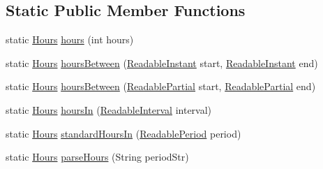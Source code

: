 \subsection*{Static Public Member Functions}
\begin{DoxyCompactItemize}
\item 
static \hyperlink{classorg_1_1joda_1_1time_1_1_hours}{Hours} \hyperlink{classorg_1_1joda_1_1time_1_1_hours_a6f0261af3e1ae208f32b5deb6b2e13d4}{hours} (int hours)
\item 
static \hyperlink{classorg_1_1joda_1_1time_1_1_hours}{Hours} \hyperlink{classorg_1_1joda_1_1time_1_1_hours_ac1421b4a81159603662caef10bdb3c27}{hours\-Between} (\hyperlink{interfaceorg_1_1joda_1_1time_1_1_readable_instant}{Readable\-Instant} start, \hyperlink{interfaceorg_1_1joda_1_1time_1_1_readable_instant}{Readable\-Instant} end)
\item 
static \hyperlink{classorg_1_1joda_1_1time_1_1_hours}{Hours} \hyperlink{classorg_1_1joda_1_1time_1_1_hours_a1ad9e15047fc7100b56f5f1695575aa9}{hours\-Between} (\hyperlink{interfaceorg_1_1joda_1_1time_1_1_readable_partial}{Readable\-Partial} start, \hyperlink{interfaceorg_1_1joda_1_1time_1_1_readable_partial}{Readable\-Partial} end)
\item 
static \hyperlink{classorg_1_1joda_1_1time_1_1_hours}{Hours} \hyperlink{classorg_1_1joda_1_1time_1_1_hours_aa853646386fb5929a68b41282f021526}{hours\-In} (\hyperlink{interfaceorg_1_1joda_1_1time_1_1_readable_interval}{Readable\-Interval} interval)
\item 
static \hyperlink{classorg_1_1joda_1_1time_1_1_hours}{Hours} \hyperlink{classorg_1_1joda_1_1time_1_1_hours_a97a20318ddf05935e4a33c3133e53af4}{standard\-Hours\-In} (\hyperlink{interfaceorg_1_1joda_1_1time_1_1_readable_period}{Readable\-Period} period)
\item 
static \hyperlink{classorg_1_1joda_1_1time_1_1_hours}{Hours} \hyperlink{classorg_1_1joda_1_1time_1_1_hours_a70264be0d9d6f82d9eb5b355754de4fb}{parse\-Hours} (String period\-Str)
\end{DoxyCompactItemize}
